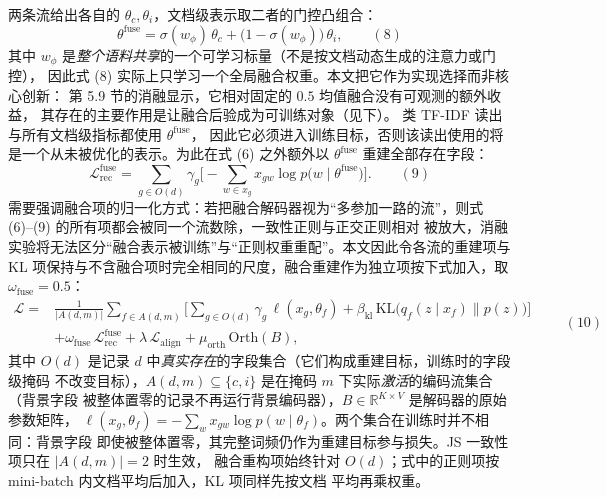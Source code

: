 \documentclass{article}
\begin{document}
两条流给出各自的 $\theta_c,\theta_i$，文档级表示取二者的门控凸组合：
\begin{equation}
\theta^{\mathrm{fuse}}=\sigma(w_\phi)\,\theta_c
+\big(1-\sigma(w_\phi)\big)\,\theta_i ,
\label{eq:gate}
\qquad(8)\end{equation}
其中 $w_\phi$ 是\emph{整个语料共享}的一个可学习标量（不是按文档动态生成的注意力或门控），
因此式 (8) 实际上只学习一个全局融合权重。本文把它作为实现选择而非核心创新：
第 5.9 节的消融显示，它相对固定的 $0.5$ 均值融合没有可观测的额外收益，
其存在的主要作用是让融合后验成为可训练对象（见下）。
类 TF-IDF 读出与所有文档级指标都使用 $\theta^{\mathrm{fuse}}$，
因此它必须进入训练目标，否则该读出使用的将是一个从未被优化的表示。为此在式
(6) 之外额外以 $\theta^{\mathrm{fuse}}$ 重建全部存在字段：
\begin{equation}
\mathcal{L}_{\mathrm{rec}}^{\mathrm{fuse}}
=\sum_{g\in O(d)}\gamma_g\Big[-\sum_{w\in x_g}x_{gw}\log p\big(w\mid\theta^{\mathrm{fuse}}\big)\Big].
\label{eq:lfuse}
\qquad(9)\end{equation}
需要强调融合项的归一化方式：若把融合解码器视为“多参加一路的流”，则式
(6)--(9) 的所有项都会被同一个流数除，一致性正则与正交正则相对
被放大，消融实验将无法区分“融合表示被训练”与“正则权重重配”。本文因此令各流的重建项与
KL 项保持与不含融合项时完全相同的尺度，融合重建作为独立项按下式加入，取
$\omega_{\mathrm{fuse}}=0.5$：
\begin{equation}
\begin{aligned}
\mathcal{L}={}&\frac{1}{|A(d,m)|}\sum_{f\in A(d,m)}
\Big[\sum_{g\in O(d)}\gamma_g\,\ell(x_g,\theta_f)
+\beta_{\mathrm{kl}}\,\mathrm{KL}\big(q_f(z\mid x_f)\parallel p(z)\big)\Big]\\
&+\omega_{\mathrm{fuse}}\,\mathcal{L}_{\mathrm{rec}}^{\mathrm{fuse}}
+\lambda\,\mathcal{L}_{\mathrm{align}}
+\mu_{\mathrm{orth}}\,\mathrm{Orth}(B),
\end{aligned}
\label{eq:total}
\qquad(10)\end{equation}
其中 $O(d)$ 是记录 $d$ 中\emph{真实存在}的字段集合（它们构成重建目标，训练时的字段级掩码
不改变目标），$A(d,m)\subseteq\{c,i\}$ 是在掩码 $m$ 下实际\emph{激活}的编码流集合（背景字段
被整体置零的记录不再运行背景编码器），$B\in\mathbb{R}^{K\times V}$ 是解码器的原始参数矩阵，
$\ell(x_g,\theta_f)=-\sum_{w}x_{gw}\log p(w\mid\theta_f)$。两个集合在训练时并不相同：背景字段
即使被整体置零，其完整词频仍作为重建目标参与损失。JS 一致性项只在 $|A(d,m)|=2$ 时生效，
融合重构项始终针对 $O(d)$；式中的正则项按 mini-batch 内文档平均后加入，KL 项同样先按文档
平均再乘权重。
\end{document}
